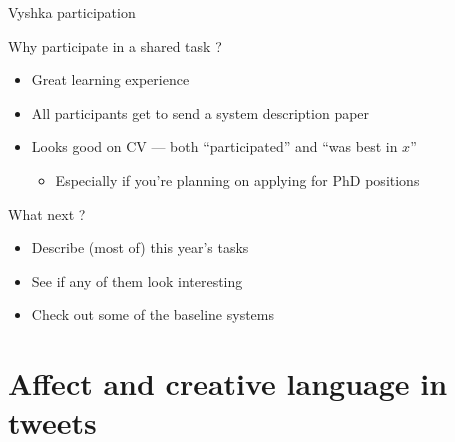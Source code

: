 \documentclass[10pt, compress]{beamer}
\begin{document}
\begin{frame}{Vyshka participation}

Why participate in a shared task ? 

\begin{itemize}
  \item Great learning experience
  \item All participants get to send a system description paper
  \item Looks good on CV --- both ``participated'' and ``was best in $x$''
  \begin{itemize}
    \item Especially if you're planning on applying for PhD positions
  \end{itemize}
\end{itemize}

What next ? 
\begin{itemize}
  \item Describe (most of) this year's tasks 
  \item See if any of them look interesting
  \item Check out some of the baseline systems 
\end{itemize}

\end{frame}

\section{Affect and creative language in tweets}
\end{document}
